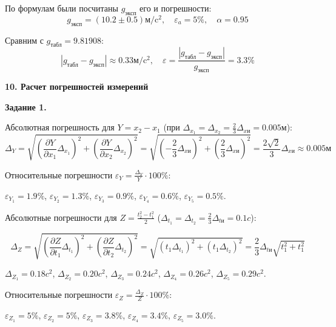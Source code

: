 \documentclass[14pt]{extreport}
\begin{document}
По формулам были посчитаны $g_\text{эксп}$ его и погрешности:
\begin{equation*}
g_\text{эксп} = (10.2 \pm 0.5)\text{м}/\text{c}^2, \quad \varepsilon_a = 5\%, \quad \alpha=0.95
\end{equation*}

Сравним с $g_\text{табл} = 9.81908$:
\begin{equation*}
|g_\text{табл} - g_\text{эксп}| \approx 0.33\text{м}/\text{c}^2, \quad \varepsilon = \frac{|g_\text{табл} - g_\text{эксп}|}{g_\text{эксп}} = 3.3\%
\end{equation*}

\noindent\textbf{10. Расчет погрешностей измерений}

\textbf{Задание 1.}

Абсолютная погрешность для $Y=x_2-x_1$ (при $\Delta_{x_1}=\Delta_{x_2}=\frac{2}{3}\Delta_{x\text{и}} = 0.005м$): 
{\fontsize{13}{13}\selectfont\begin{equation*}
    \Delta_Y =
    \sqrt{(\frac{\partial Y}{\partial x_1}\Delta_{x_1})^2+(\frac{\partial Y}{\partial x_2}\Delta_{x_2})^2} =
    \sqrt{(-\frac{2}{3}\Delta_{x\text{и}})^2+(\frac{2}{3}\Delta_{x\text{и}})^2} = 
    \frac{2\sqrt{2}}{3}\Delta_{x\text{и}} \approx 0.005\text{м}
\end{equation*}}

Относительные погрешности $\varepsilon_Y=\frac{\Delta_Y}{Y}\cdot100\%$:

$\varepsilon_{Y_1}=1.9\%$, $\varepsilon_{Y_2}=1.3\%$, $\varepsilon_{Y_3}=0.9\%$, $\varepsilon_{Y_4}=0.6\%$, $\varepsilon_{Y_5}=0.5\%$.

Абсолютные погрешности для $Z= \frac{t_2^2-t_1^2}{2}$  ($\Delta_{t_1}=\Delta_{t_2}=\frac{2}{3}\Delta_{t\text{и}} = 0.1c$): 

{\fontsize{13}{13}\selectfont\begin{equation*}
    \Delta_Z =
    \sqrt{(\frac{\partial Z}{\partial t_1}\Delta_{t_1})^2+(\frac{\partial Z}{\partial t_2}\Delta_{t_2})^2} =
    \sqrt{(t_1\Delta_{t_1})^2+(t_1\Delta_{t_2})^2} =
    \frac{2}{3}\Delta_{t\text{и}}\sqrt{t_1^2+t_1^2}
\end{equation*}}

$\Delta_{Z_1}=0.18 {c^2}$, $\Delta_{Z_2}=0.20 {c^2}$, $\Delta_{Z_3}=0.24 {c^2}$, $\Delta_{Z_4}=0.26 {c^2}$, $\Delta_{Z_5}=0.29 {c^2}$.

Относительные погрешности $\varepsilon_Z=\frac{\Delta_Z}{Z}\cdot100\%$:

$\varepsilon_{Z_1}=5\%$, $\varepsilon_{Z_2}=5\%$, $\varepsilon_{Z_3}=3.8\%$, $\varepsilon_{Z_4}=3.4\%$, $\varepsilon_{Z_5}=3.0\%$.
\end{document}
